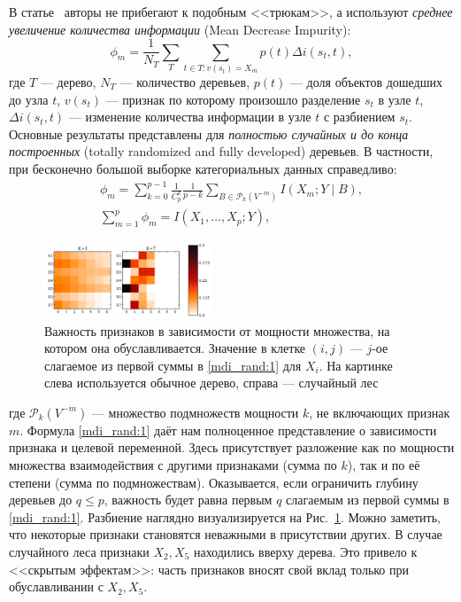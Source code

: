 \documentclass[12pt]{article}
\begin{document}
В статье~\citep{mdi_randomized} авторы не прибегают к подобным <<трюкам>>, а используют \emph{среднее увеличение количества информации} (Mean Decrease Impurity):
\begin{equation*}
    \phi_{m}=\frac{1}{N_{T}} \sum_{T} \sum_{t \in T: v\left(s_{t}\right)=X_{m}} p(t) \Delta i\left(s_{t}, t\right),
\end{equation*}
где $T$ --- дерево, $N_T$ --- количество деревьев, $p(t)$ --- доля объектов дошедших до узла $t$,  \hspace{2em} $v\left(s_{t}\right)$ --- признак по которому произошло разделение $s_t$ в узле $t$, $\Delta i\left(s_{t}, t\right)$ --- изменение количества информации в узле $t$ с разбиением $s_t$.
Основные результаты представлены для \emph{полностью случайных и до конца построенных} (totally randomized and fully developed) деревьев. 
\newpage
В частности, при бесконечно большой выборке категориальных данных справедливо:
\begin{gather}
    \phi_{m}=\sum_{k=0}^{p-1} \frac{1}{C_{p}^{k}} \frac{1}{p-k} \sum_{B \in \mathcal{P}_{k}\left(V^{-m}\right)} I\left(X_{m} ; Y \mid B\right)\label{mdi_rand:1}, \\
    \sum_{m=1}^{p} \phi_{m}=I\left(X_{1}, \ldots, X_{p} ; Y\right)\label{mdi_rand:2},
\end{gather}

\begin{figure}
\centering
\includegraphics[width=0.45\textwidth]{images/mdi_randomized_pic.png}
\caption{\label{fig:mdi_rand_pic}\centering Важность признаков в зависимости от мощности множества, на котором она обуславливается. Значение в клетке $(i, j)$ --- $j$-ое слагаемое из первой суммы в \eqref{mdi_rand:1} для $X_i$. На картинке слева используется обычное дерево, справа --- случайный лес~\citep{mdi_randomized}}
\end{figure}

где $\mathcal{P}_{k}\left(V^{-m}\right)$ --- множество подмножеств мощности $k$, не включающих признак $m$.
Формула \eqref{mdi_rand:1} даёт нам полноценное представление о зависимости признака и целевой переменной. Здесь присутствует разложение как по мощности множества взаимодействия с другими признаками (сумма по $k$), так и по её степени (сумма по подмножествам). Оказывается, если ограничить глубину деревьев до $q \leq p$, важность будет равна первым $q$ слагаемым из первой суммы в \eqref{mdi_rand:1}. Разбиение наглядно визуализируется на Рис.~\ref{fig:mdi_rand_pic}. Можно заметить, что некоторые признаки становятся неважными в присутствии других. В случае случайного леса признаки $X_2, X_5$ находились вверху дерева. Это привело к <<скрытым эффектам>>: часть признаков вносят свой вклад только при обуславливании с $X_2, X_5$.
\end{document}
